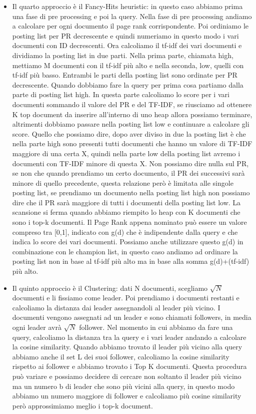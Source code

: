 \documentclass[14pt]{extreport}
\begin{document}
\begin{itemize}
    \item Il quarto approccio è il Fancy-Hits heuristic: in questo caso abbiamo prima una fase di pre processing e poi la query. 
    Nella fase di pre processing andiamo a calcolare per ogni documento il page rank corrispondente. Poi ordiniamo le posting list per PR decrescente e quindi numeriamo in questo modo i vari documenti con ID decrescenti.
    Ora calcoliamo il tf-idf dei vari documenti e dividiamo la posting list in due parti. Nella prima parte, chiamata high, mettiamo M documenti con il tf-idf più alto e nella seconda, low, quelli con tf-idf più basso. Entrambi le parti della posting list sono ordinate per PR decrescente.
    Quando dobbiamo fare la query per prima cosa partiamo dalla parte di posting list high. In questa parte calcoliamo lo score per i vari documenti sommando il valore del PR e del TF-IDF, se riusciamo ad ottenere K top document da inserire all'interno di uno heap allora possiamo terminare, altrimenti dobbiamo passare nella posting list low e continuare a calcolare gli score.
    Quello che possiamo dire, dopo aver diviso in due la posting list è che nella parte high sono presenti tutti documenti che hanno un valore di TF-IDF maggiore di una certa X, quindi nella parte low della posting list avremo i documenti con TF-IDF minore di questa X. Non possiamo dire nulla sul PR, se non che quando prendiamo un certo documento, il PR dei successivi sarà minore di quello precedente, questa relazione però è limitata alle singole posting list, se prendiamo un documento nella posting list high non possiamo dire che il PR sarà maggiore di tutti i documenti della posting list low.
    La scansione si ferma quando abbiamo riempito lo heap con K documenti che sono i top-k documenti.
    Il Page Rank appena nominato può essere un valore compreso tra [0,1], indicato con g(d) che è indipendente dalla query e che indica lo score dei vari documenti.
    Possiamo anche utilizzare questo g(d) in combinazione con le champion list, in questo caso andiamo ad ordinare la posting list non in base al tf-idf più alto ma in base alla somma g(d)+(tf-idf) più alto.
    \item Il quinto approccio è il Clustering: dati N documenti, scegliamo $\sqrt{N}$ documenti e li fissiamo come leader. Poi prendiamo i documenti restanti e calcoliamo la distanza dai leader assegnandoli al leader più vicino.
    I documenti vengono assegnati ad un leader e sono chiamati followers, in media ogni leader avrà $\sqrt{N}$ follower.
    Nel momento in cui abbiamo da fare una query, calcoliamo la distanza tra la query e i vari leader andando a calcolare la cosine similarity. Quando abbiamo trovato il leader più vicino alla query abbiamo anche il set L dei suoi follower, calcoliamo la cosine similarity rispetto ai follower e abbiamo trovato i Top K documenti.
    Questa procedura può variare e possiamo decidere di cercare non soltanto il leader più vicino ma un numero b di leader che sono più vicini alla query, in questo modo abbiamo un numero maggiore di follower e calcoliamo più cosine similarity però approssimiamo meglio i top-k document.
\end{itemize}
\end{document}
